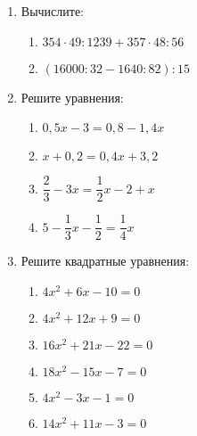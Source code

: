\documentclass[12pt, a4paper]{article}
\begin{document}
	
	\begin{enumerate}
		\item Вычислите:
		\begin{multicols}{2}
			\begin{enumerate}[label=\asbuk*)]
				\item $354\cdot 49:1239+357\cdot48:56$
				\item $(16000:32-1640:82):15$
		\end{enumerate}
		\end{multicols}
	\item Решите уравнения:
			\begin{multicols}{2}
			\begin{enumerate}[label=\asbuk*)]
				\item $0,5x-3=0,8-1,4x$
				\item $x+0,2=0,4x+3,2$
				\item $\dfrac{2}{3}-3x=\dfrac{1}{2}x-2+x$
				\item $5-\dfrac{1}{3}x-\dfrac{1}{2}=\dfrac{1}{4}x$
			\end{enumerate}
		\end{multicols}
	\item Решите квадратные уравнения:
	\begin{multicols}{2}
		\begin{enumerate}[label=\asbuk*)]
		\item $4x^2+6x-10=0$
		\item $4x^2+12x+9=0$
		\item $16x^2+21x-22=0$
		\item $18x^2-15x-7=0$
		\item $4x^2-3x-1=0$
		\item $14x^2+11x-3=0$
		\end{enumerate}
	\end{multicols}
	\end{enumerate}
\end{document}
